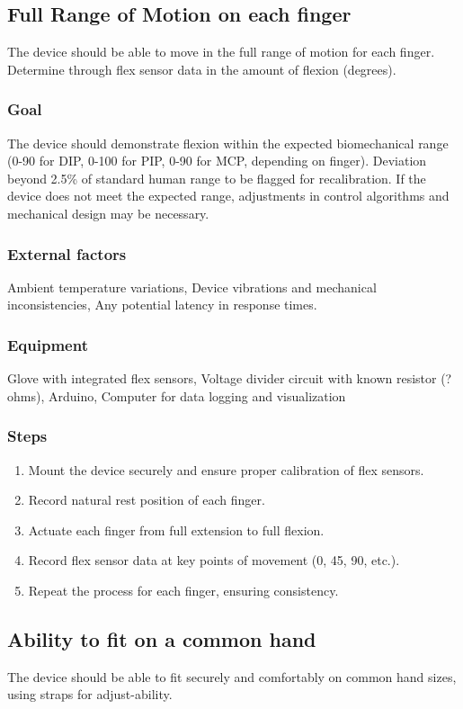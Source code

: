 \documentclass{article}
\begin{document}
\subsection{Full Range of Motion on each finger}
The device should be able to move in the full range of
motion for each finger. Determine through flex sensor data in the amount of flexion (degrees).
\subsubsection{Goal} The device should demonstrate flexion within the expected biomechanical range (0-90 for DIP, 0-100 for PIP, 0-90 for MCP, depending on finger). Deviation beyond 2.5\% of standard human range to be flagged for recalibration. If the device does not meet the expected range, adjustments in control algorithms and
mechanical design may be necessary.
\subsubsection{External factors}
Ambient temperature variations, Device vibrations and mechanical inconsistencies, Any potential latency in response times.
\subsubsection{Equipment}
Glove with integrated flex sensors, Voltage divider circuit with known resistor (? ohms), Arduino, Computer for data logging and visualization
\subsubsection{Steps}
\begin{enumerate}
    \item Mount the device securely and ensure proper calibration of flex sensors.
    \item Record natural rest position of each finger.
    \item Actuate each finger from full extension to full flexion.
    \item Record flex sensor data at key points of movement (0, 45, 90, etc.).
    \item Repeat the process for each finger, ensuring consistency.
\end{enumerate}

\subsection{Ability to fit on a common hand}
The device should be able to fit securely and comfortably on common hand sizes, using straps for adjust-ability.
\end{document}
